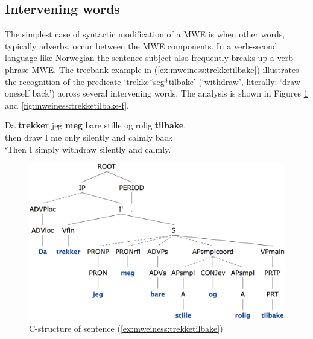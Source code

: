 \documentclass[output=paper]{langsci/langscibook}
\begin{document}
\subsection{Intervening words}

The simplest case of syntactic modification of a MWE is when other words, typically adverbs, occur between the MWE components.
In a verb-second language like Norwegian the sentence subject also frequently breaks up a verb phrase MWE.
The treebank example in (\ref{ex:mweiness:trekketilbake})  illustrates the recognition of the predicate `trekke*seg*tilbake' (`withdraw', literally: `draw oneself back') across several intervening words.
The analysis is shown in Figures \ref{fig:mweiness:trekketilbake-c} and \ref{fig:mweiness:trekketilbake-f}. 

\ea\label{ex:mweiness:trekketilbake}
\gll Da \textbf{trekker} jeg \textbf{meg} bare stille og rolig \textbf{tilbake}.\\
     then draw I me only silently and calmly back\\
\glt `Then I simply withdraw silently and calmly.'
\z


\begin{figure}
  \includegraphics[height=.31\textheight]{figures/trekketilbake-c.png}
  \caption{C-structure of sentence (\ref{ex:mweiness:trekketilbake})}
  \label{fig:mweiness:trekketilbake-c}
\end{figure}
\end{document}
